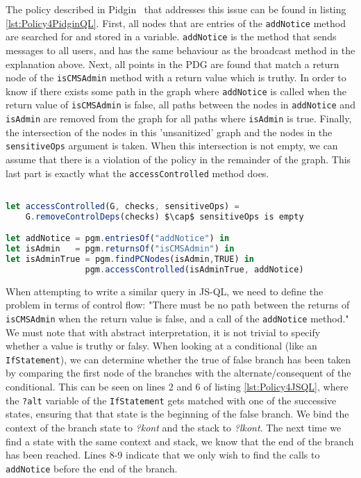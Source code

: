 The policy described in Pidgin~\cite{PidginQLTechReport} that addresses this issue can be found in listing \ref{lst:Policy4PidginQL}. First, all nodes that are entries of the \texttt{addNotice} method are searched for and stored in a variable. \texttt{addNotice} is the method that sends messages to all users, and has the same behaviour as the broadcast method in the explanation above. Next, all points in the PDG are found that match a return node of the \texttt{isCMSAdmin} method with a return value which is truthy. In order to know if there exists some path in the graph where \texttt{addNotice} is called when the return value of \texttt{isCMSAdmin} is false, all paths between the nodes in \texttt{addNotice} and \texttt{isAdmin} are removed from the graph for all paths where \texttt{isAdmin} is true. Finally, the intersection of the nodes in this 'unsanitized' graph and the nodes in the \texttt{sensitiveOps} argument is taken. When this intersection is not empty, we can assume that there is a violation of the policy in the remainder of the graph. This last part is exactly what the \texttt{accessControlled} method does.

\begin{lstlisting}[label={lst:Policy4PidginQL},language=JavaScript,caption=Policy 4 in PidginQL,mathescape=true]  % float=t?

let accessControlled(G, checks, sensitiveOps) = 
    G.removeControlDeps(checks) $\cap$ sensitiveOps is empty

let addNotice = pgm.entriesOf("addNotice") in
let isAdmin   = pgm.returnsOf("isCMSAdmin") in 
let isAdminTrue = pgm.findPCNodes(isAdmin,TRUE) in
                pgm.accessControlled(isAdminTrue, addNotice)
\end{lstlisting}

When attempting to write a similar query in JS-QL, we need to define the problem in terms of control flow: "There must be no path between the returns of \texttt{isCMSAdmin} when the return value is false, and a call of the \texttt{addNotice} method." We must note that with abstract interpretation, it is not trivial to specify whether a value is truthy or falsy. When looking at a conditional (like an \texttt{IfStatement}), we can determine whether the true of false branch has been taken by comparing the first node of the branches with the alternate/consequent of the conditional. This can be seen on lines 2 and 6 of listing \ref{lst:Policy4JSQL}, where the \texttt{?alt} variable of the \texttt{IfStatement} gets matched with one of the successive states, ensuring that that state is the beginning of the false branch. We bind the context of the branch state to \textit{?kont} and the stack to \textit{?lkont}. The next time we find a state with the same context and stack, we know that the end of the branch has been reached. Lines 8-9 indicate that we only wish to find the calls to \texttt{addNotice} before the end of the branch.

